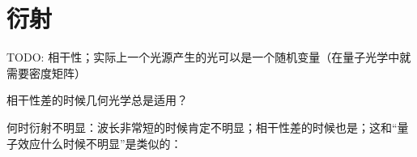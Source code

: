 \section{衍射}

TODO: 相干性；实际上一个光源产生的光可以是一个随机变量（在量子光学中就需要密度矩阵）

相干性差的时候几何光学总是适用？

何时衍射不明显：波长非常短的时候肯定不明显；相干性差的时候也是；这和“量子效应什么时候不明显”是类似的：